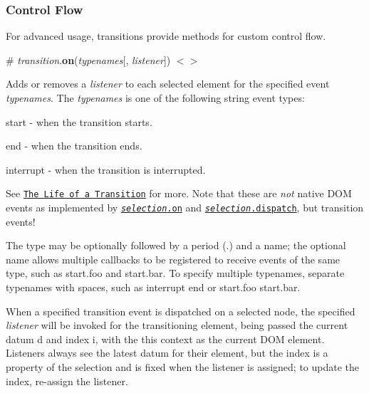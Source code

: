 \subsubsection*{Control Flow}

For advanced usage, transitions provide methods for custom control flow.

\label{_transition_on}%
\# {\itshape transition}.{\bfseries on}({\itshape typenames}\mbox{[}, {\itshape listener}\mbox{]}) \href{https://github.com/d3/d3-transition/blob/master/src/transition/on.js}{\tt $<$$>$}

Adds or removes a {\itshape listener} to each selected element for the specified event {\itshape typenames}. The {\itshape typenames} is one of the following string event types\+:


\begin{DoxyItemize}
\item {\ttfamily start} -\/ when the transition starts.
\item {\ttfamily end} -\/ when the transition ends.
\item {\ttfamily interrupt} -\/ when the transition is interrupted.
\end{DoxyItemize}

See \href{#the-life-of-a-transition}{\tt The Life of a Transition} for more. Note that these are {\itshape not} native D\+OM events as implemented by \href{https://github.com/d3/d3-selection#selection_on}{\tt {\itshape selection}.on} and \href{https://github.com/d3/d3-selection#selection_dispatch}{\tt {\itshape selection}.dispatch}, but transition events!

The type may be optionally followed by a period ({\ttfamily .}) and a name; the optional name allows multiple callbacks to be registered to receive events of the same type, such as {\ttfamily start.\+foo} and {\ttfamily start.\+bar}. To specify multiple typenames, separate typenames with spaces, such as {\ttfamily interrupt end} or {\ttfamily start.\+foo start.\+bar}.

When a specified transition event is dispatched on a selected node, the specified {\itshape listener} will be invoked for the transitioning element, being passed the current datum {\ttfamily d} and index {\ttfamily i}, with the {\ttfamily this} context as the current D\+OM element. Listeners always see the latest datum for their element, but the index is a property of the selection and is fixed when the listener is assigned; to update the index, re-\/assign the listener.

